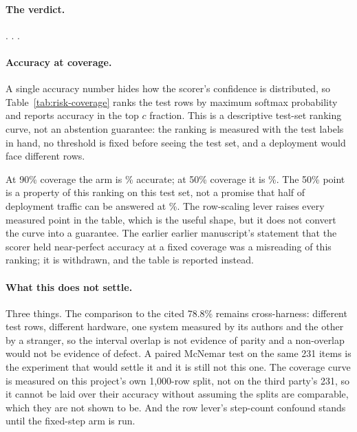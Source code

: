 \paragraph{The verdict.} \ShipHeadline. \ShipGapSentence. \ShipFuture.

\paragraph{Accuracy at coverage.} A single accuracy number hides how the
scorer's confidence is distributed, so Table~\ref{tab:risk-coverage} ranks the
test rows by maximum softmax probability and reports accuracy in the top $c$
fraction. This is a descriptive test-set ranking curve, not an abstention
guarantee: the ranking is measured with the test labels in hand, no threshold is
fixed before seeing the test set, and a deployment would face different rows.



At 90\% coverage the arm is \ShipAtNinety\% accurate; at 50\% coverage it is
\ShipAtFifty\%. The 50\% point is a property of this ranking on this test set,
not a promise that half of deployment traffic can be answered at \ShipAtFifty\%.
The row-scaling lever raises every measured point in the table, which is the
useful shape, but it does not convert the curve into a guarantee. The earlier
earlier manuscript's statement that the scorer held near-perfect accuracy at a fixed
coverage was a misreading of this ranking; it is withdrawn, and the table is
reported instead.

\paragraph{What this does not settle.} Three things. The comparison to the
cited 78.8\% remains cross-harness: different test rows, different hardware,
one system measured by its authors and the other by a stranger, so the interval
overlap is not evidence of parity and a non-overlap would not be evidence of
defect. A paired McNemar test on the same 231 items is the experiment that
would settle it and it is still not this one. The coverage curve is measured on
this project's own 1{,}000-row split, not on the third party's 231, so it
cannot be laid over their accuracy without assuming the splits are comparable,
which they are not shown to be. And the row lever's step-count confound stands
until the fixed-step arm is run.
